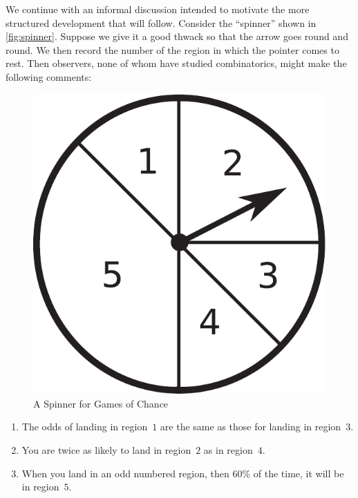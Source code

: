 We continue with an informal discussion intended to motivate
the more structured development that will follow.  Consider
the ``spinner'' shown in \autoref{fig:spinner}.  Suppose we give it 
a good thwack so that the arrow goes round and round.  We then 
record the number of the region in which the pointer comes to rest.  
Then observers, none of whom have studied combinatorics, might
make the following comments: 

\begin{figure}
\begin{center}
\includegraphics*[scale=.4]{probability-figs/spinner.pdf}
\caption{A Spinner for Games of Chance}
\label{fig:spinner}
\end{center}
\end{figure}

\begin{enumerate}
\item The odds of landing in region~$1$ are the same as those for
landing in region~$3$.
\item You are twice as likely to land in region~$2$ as in region~$4$.
\item When you land in an odd numbered region, then 60\% of the time,
it will be in region~$5$.
\end{enumerate}

